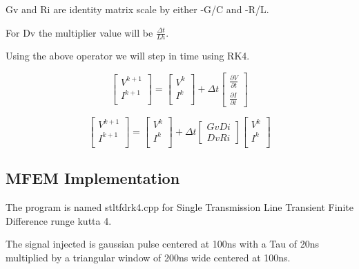 \documentclass[12pt, letterpaper]{article}
\begin{document}
Gv and Ri are identity matrix scale by either -G/C and -R/L.

For Dv the multiplier value will be $\frac{\Delta t}{L h}$.

Using the above operator we will step in time using RK4.



\begin{equation}
	\begin{bmatrix}
		V^{k+1} \\
		I^{k+1} \\
	\end{bmatrix}
	=
	\begin{bmatrix}
		V^k \\
		I^k \\
	\end{bmatrix}
	+
	\Delta t
	\begin{bmatrix}
		\frac{\partial{V}}{\partial{t}} \\
		\frac{\partial{I}}{\partial{t}} 
	\end{bmatrix}	
\end{equation}

\begin{equation}
	\begin{bmatrix}
		V^{k+1} \\
		I^{k+1} \\
	\end{bmatrix}
	=
	\begin{bmatrix}
		V^k \\
		I^k \\
	\end{bmatrix}
	+
	\Delta t
	\begin{bmatrix}
		Gv Di \\
		Dv Ri
	\end{bmatrix}
	\begin{bmatrix}
		V^k \\
		I^k \\
	\end{bmatrix}	
\end{equation}


\subsection{MFEM Implementation}

The program is named stltfdrk4.cpp for Single Transmission Line Transient Finite Difference runge kutta 4.

The signal injected is  gaussian pulse centered at 100ns with a Tau of 20ns multiplied by a triangular window of 200ns wide centered at 100ns.\\
\end{document}
